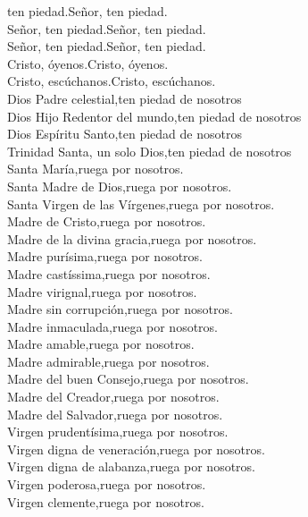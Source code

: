 ten piedad.{\hfill}Señor, ten piedad.\\
Señor, ten piedad.{\hfill}Señor, ten piedad.\\
Señor, ten piedad.{\hfill}Señor, ten piedad.\\
Cristo, óyenos.{\hfill}Cristo, óyenos.\\
Cristo, escúchanos.{\hfill}Cristo, escúchanos.\\
Dios Padre celestial,{\hfill}ten piedad de nosotros\\
Dios Hijo Redentor del mundo,{\hfill}ten piedad de nosotros\\
Dios Espíritu Santo,{\hfill}ten piedad de nosotros\\
Trinidad Santa, un solo Dios,{\hfill}ten piedad de nosotros\\
Santa María,{\hfill}ruega por nosotros.\\
Santa Madre de Dios,{\hfill}ruega por nosotros.\\
Santa Virgen de las Vírgenes,{\hfill}ruega por nosotros.\\
Madre de Cristo,{\hfill}ruega por nosotros.\\
Madre de la divina gracia,{\hfill}ruega por nosotros.\\
Madre purísima,{\hfill}ruega por nosotros.\\
Madre castíssima,{\hfill}ruega por nosotros.\\
Madre virignal,{\hfill}ruega por nosotros.\\
Madre sin corrupción,{\hfill}ruega por nosotros.\\
Madre inmaculada,{\hfill}ruega por nosotros.\\
Madre amable,{\hfill}ruega por nosotros.\\
Madre admirable,{\hfill}ruega por nosotros.\\
Madre del buen Consejo,{\hfill}ruega por nosotros.\\
Madre del Creador,{\hfill}ruega por nosotros.\\
Madre del Salvador,{\hfill}ruega por nosotros.\\
Virgen prudentísima,{\hfill}ruega por nosotros.\\
Virgen digna de veneración,{\hfill}ruega por nosotros.\\
Virgen digna de alabanza,{\hfill}ruega por nosotros.\\
Virgen poderosa,{\hfill}ruega por nosotros.\\
Virgen clemente,{\hfill}ruega por nosotros.\\
